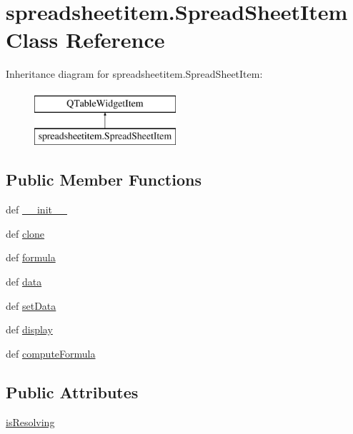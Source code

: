 \hypertarget{classspreadsheetitem_1_1SpreadSheetItem}{}\section{spreadsheetitem.\+Spread\+Sheet\+Item Class Reference}
\label{classspreadsheetitem_1_1SpreadSheetItem}
Inheritance diagram for spreadsheetitem.\+Spread\+Sheet\+Item\+:\begin{figure}[H]
\begin{center}
\leavevmode
\includegraphics[height=2.000000cm]{classspreadsheetitem_1_1SpreadSheetItem}
\end{center}
\end{figure}
\subsection*{Public Member Functions}
\begin{DoxyCompactItemize}
\item 
def \hyperlink{classspreadsheetitem_1_1SpreadSheetItem_ad7978d181447990024d4c13f17fac0df}{\+\_\+\+\_\+init\+\_\+\+\_\+}
\item 
def \hyperlink{classspreadsheetitem_1_1SpreadSheetItem_aeedf9987ff9e3700a47d3de911f2d71d}{clone}
\item 
def \hyperlink{classspreadsheetitem_1_1SpreadSheetItem_a1fedc3c4d9bf5124aed08befc4e57e25}{formula}
\item 
def \hyperlink{classspreadsheetitem_1_1SpreadSheetItem_a99d67e3843bd8cdb947ea96e3a6b938f}{data}
\item 
def \hyperlink{classspreadsheetitem_1_1SpreadSheetItem_a21d659b6dafde49ddee104455ec8f976}{set\+Data}
\item 
def \hyperlink{classspreadsheetitem_1_1SpreadSheetItem_ab0cf6aeffc212972b74b1c3ffbd12fc0}{display}
\item 
def \hyperlink{classspreadsheetitem_1_1SpreadSheetItem_aafcde5d96ae6cce3190b7503282a0aad}{compute\+Formula}
\end{DoxyCompactItemize}
\subsection*{Public Attributes}
\begin{DoxyCompactItemize}
\item 
\hyperlink{classspreadsheetitem_1_1SpreadSheetItem_a37484a2fc6c8cf427f58ee87e3f308e1}{is\+Resolving}
\end{DoxyCompactItemize}


